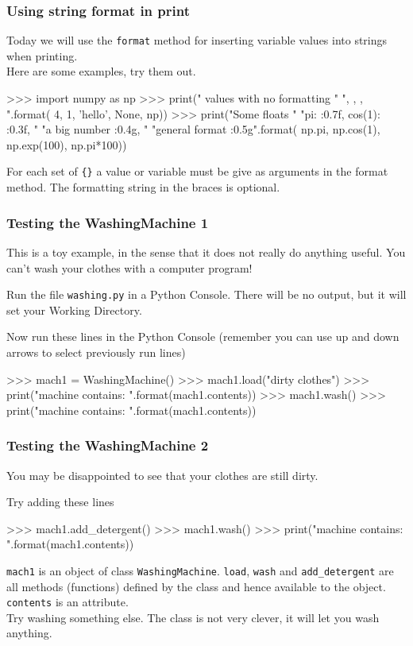 \documentclass{beamer}
\begin{document}
\begin{frame}[fragile]
\frametitle{Using string format in print}
Today we will use the \lstinline|format| method for inserting variable values into strings when printing.\\
Here are some examples, try them out.
\begin{code}
>>> import numpy as np
>>> print("{} values with no formatting "
        "{}, {}, {}, {}".format(
        4, 1, 'hello', None, np))
>>> print("Some floats "
        "pi: {:0.7f}, cos(1): {:0.3f}, "
        "a big number {:0.4g}, "
        "general format {:0.5g}".format(
            np.pi, np.cos(1), np.exp(100), np.pi*100))
\end{code}
For each set of \lstinline|{}| a value or variable must be give as arguments in the format method.
The formatting string in the braces is optional.

\end{frame}

\begin{frame}[fragile]
\frametitle{Testing the WashingMachine 1}
This is a toy example, in the sense that it does not really do anything useful.
You can't wash your clothes with a computer program!

Run the file \texttt{washing.py} in a Python Console. There will be no output, 
but it will set your Working Directory. 

Now run these lines in the Python Console
(remember you can use up and down arrows to select previously run lines)
\begin{code} 
>>> mach1 = WashingMachine()
>>> mach1.load("dirty clothes")
>>> print("machine contains: {}".format(mach1.contents))
>>> mach1.wash()
>>> print("machine contains: {}".format(mach1.contents))
\end{code}

\end{frame}

\begin{frame}[fragile]
\frametitle{Testing the WashingMachine 2}
You may be disappointed to see that your clothes are still dirty.

Try adding these lines
\begin{code} 
>>> mach1.add_detergent()
>>> mach1.wash()
>>> print("machine contains: {}".format(mach1.contents))
\end{code}

\texttt{mach1} is an object of class \texttt{WashingMachine}.
\texttt{load}, \texttt{wash} and \texttt{add\_detergent}
are all methods (functions) defined by the class and hence available to the object.
\texttt{contents} is an attribute.\\
\smallskip
Try washing something else. The class is not very clever, it will let you wash anything.

\end{frame}
\end{document}
